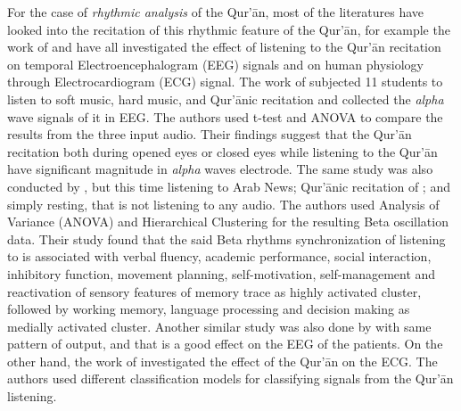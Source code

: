 For the case of \textit{rhythmic analysis} of the Qur'\=an, most of the literatures have looked into the recitation of this rhythmic feature of the Qur'\=an, for example the work of  and  have all investigated the effect of listening to the Qur'\=an recitation on temporal Electroencephalogram (EEG) signals and on human physiology through Electrocardiogram (ECG) signal. The work of  subjected 11 students to listen to soft music, hard music, and Qur'\=anic recitation and collected the \textit{alpha} wave signals of it in EEG. The authors used t-test and ANOVA to compare the results from the three input audio. Their findings suggest that the Qur'\=an recitation both during opened eyes or closed eyes while listening to the Qur'\=an have significant magnitude in \textit{alpha} waves electrode. The same study was also conducted by , but this time listening to Arab News; Qur'\=anic recitation of  ; and simply resting, that is not listening to any audio. The authors used Analysis of Variance (ANOVA) and Hierarchical Clustering for the resulting Beta oscillation data. Their study found that the said Beta rhythms synchronization
of listening to   is associated with verbal fluency, academic performance, social
interaction, inhibitory function, movement planning, self-motivation, self-management and
reactivation of sensory features of memory trace as highly activated cluster, followed by working memory, language processing and decision making as medially activated cluster. Another similar study was also done by  with same pattern of output, and that is a good effect on the EEG of the patients. On the other hand, the work of  investigated the effect of the Qur'\=an on the ECG. The authors used different classification models for classifying signals from the Qur'\=an listening. 

